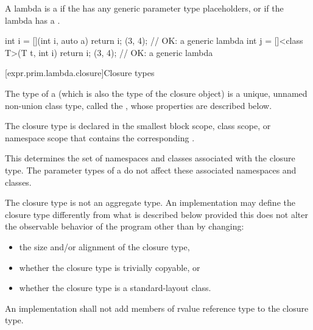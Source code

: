 \pnum
A lambda is a 
if the 
has any generic parameter type placeholders, or
if the lambda has a .
\begin{example}
\begin{codeblock}
int i = [](int i, auto a) { return i; }(3, 4);                  // OK: a generic lambda
int j = []<class T>(T t, int i) { return i; }(3, 4);            // OK: a generic lambda
\end{codeblock}
\end{example}

[expr.prim.lambda.closure]{Closure types}%

\pnum
The type of a  (which is also the type of the
closure object) is a unique, unnamed non-union class type,
called the ,
whose properties are described below.

\pnum
The closure type is declared in the smallest block
scope, class scope, or namespace scope that contains the corresponding
.
\begin{note}
This determines the set of namespaces and
classes associated with the closure type. The parameter
types of a  do not affect these associated namespaces and
classes.
\end{note}
The closure type is not an aggregate type.
An implementation may define the closure type differently from what
is described below provided this does not alter the observable behavior of the program
other than by changing:
\begin{itemize}
\item the size and/or alignment of the closure type,

\item whether the closure type is trivially copyable, or

\item whether the closure type is a standard-layout class.
\end{itemize}

An implementation shall not add members of rvalue reference type to the closure
type.

